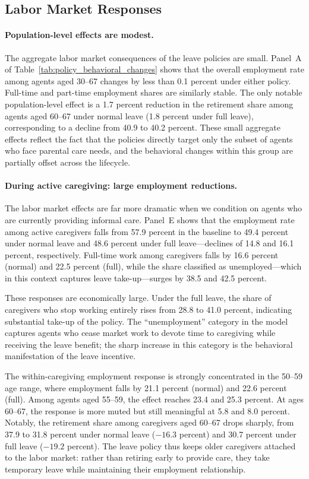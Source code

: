 \subsection{Labor Market Responses}\label{subsec:labor_market}

\paragraph{Population-level effects are modest.} The aggregate labor market consequences of the leave policies are small. Panel~A of Table~\ref{tab:policy_behavioral_changes} shows that the overall employment rate among agents aged 30--67 changes by less than 0.1 percent under either policy. Full-time and part-time employment shares are similarly stable. The only notable population-level effect is a 1.7 percent reduction in the retirement share among agents aged 60--67 under normal leave (1.8 percent under full leave), corresponding to a decline from 40.9 to 40.2 percent. These small aggregate effects reflect the fact that the policies directly target only the subset of agents who face parental care needs, and the behavioral changes within this group are partially offset across the lifecycle.

\paragraph{During active caregiving: large employment reductions.} The labor market effects are far more dramatic when we condition on agents who are currently providing informal care. Panel~E shows that the employment rate among active caregivers falls from 57.9 percent in the baseline to 49.4 percent under normal leave and 48.6 percent under full leave---declines of 14.8 and 16.1 percent, respectively. Full-time work among caregivers falls by 16.6 percent (normal) and 22.5 percent (full), while the share classified as unemployed---which in this context captures leave take-up---surges by 38.5 and 42.5 percent.

These responses are economically large. Under the full leave, the share of caregivers who stop working entirely rises from 28.8 to 41.0 percent, indicating substantial take-up of the policy. The ``unemployment'' category in the model captures agents who cease market work to devote time to caregiving while receiving the leave benefit; the sharp increase in this category is the behavioral manifestation of the leave incentive.

The within-caregiving employment response is strongly concentrated in the 50--59 age range, where employment falls by 21.1 percent (normal) and 22.6 percent (full). Among agents aged 55--59, the effect reaches 23.4 and 25.3 percent. At ages 60--67, the response is more muted but still meaningful at 5.8 and 8.0 percent. Notably, the retirement share among caregivers aged 60--67 drops sharply, from 37.9 to 31.8 percent under normal leave ($-16.3$ percent) and 30.7 percent under full leave ($-19.2$ percent). The leave policy thus keeps older caregivers attached to the labor market: rather than retiring early to provide care, they take temporary leave while maintaining their employment relationship.

